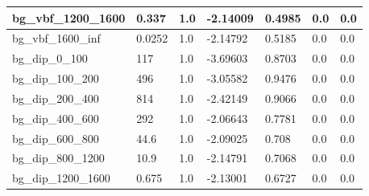 \documentclass[a4paper, 10pt]{article}
\begin{document}
\begin{table}[H]
\begin{center}
\begin{tabular}{|m{23.0mm}|m{23.0mm}|m{18.0mm}|m{19.0mm}|m{19.0mm}|m{19.0mm}|m{19.0mm}|}
      \hline
      {\cellcolor{white}         bg\_vbf\_1200\_1600}& {\cellcolor{white}         0.337}& {\cellcolor{white}         1.0}& {\cellcolor{white}         -2.14009}& {\cellcolor{white}         0.4985}& {\cellcolor{green}         0.0}& {\cellcolor{green}         0.0}\\
      \hline
      {\cellcolor{white}         bg\_vbf\_1600\_inf}& {\cellcolor{white}         0.0252}& {\cellcolor{white}         1.0}& {\cellcolor{white}         -2.14792}& {\cellcolor{white}         0.5185}& {\cellcolor{green}         0.0}& {\cellcolor{green}         0.0}\\
      \hline
      {\cellcolor{white}         bg\_dip\_0\_100}& {\cellcolor{white}         117}& {\cellcolor{white}         1.0}& {\cellcolor{white}         -3.69603}& {\cellcolor{white}         0.8703}& {\cellcolor{green}         0.0}& {\cellcolor{green}         0.0}\\
      \hline
      {\cellcolor{white}         bg\_dip\_100\_200}& {\cellcolor{white}         496}& {\cellcolor{white}         1.0}& {\cellcolor{white}         -3.05582}& {\cellcolor{white}         0.9476}& {\cellcolor{green}         0.0}& {\cellcolor{green}         0.0}\\
      \hline
      {\cellcolor{white}         bg\_dip\_200\_400}& {\cellcolor{white}         814}& {\cellcolor{white}         1.0}& {\cellcolor{white}         -2.42149}& {\cellcolor{white}         0.9066}& {\cellcolor{green}         0.0}& {\cellcolor{green}         0.0}\\
      \hline
      {\cellcolor{white}         bg\_dip\_400\_600}& {\cellcolor{white}         292}& {\cellcolor{white}         1.0}& {\cellcolor{white}         -2.06643}& {\cellcolor{white}         0.7781}& {\cellcolor{green}         0.0}& {\cellcolor{green}         0.0}\\
      \hline
      {\cellcolor{white}         bg\_dip\_600\_800}& {\cellcolor{white}         44.6}& {\cellcolor{white}         1.0}& {\cellcolor{white}         -2.09025}& {\cellcolor{white}         0.708}& {\cellcolor{green}         0.0}& {\cellcolor{green}         0.0}\\
      \hline
      {\cellcolor{white}         bg\_dip\_800\_1200}& {\cellcolor{white}         10.9}& {\cellcolor{white}         1.0}& {\cellcolor{white}         -2.14791}& {\cellcolor{white}         0.7068}& {\cellcolor{green}         0.0}& {\cellcolor{green}         0.0}\\
      \hline
      {\cellcolor{white}         bg\_dip\_1200\_1600}& {\cellcolor{white}         0.675}& {\cellcolor{white}         1.0}& {\cellcolor{white}         -2.13001}& {\cellcolor{white}         0.6727}& {\cellcolor{green}         0.0}& {\cellcolor{green}         0.0}\\

\end{tabular}
\end{center}
\end{table}
\end{document}
